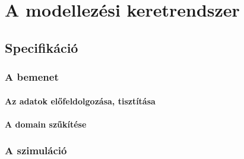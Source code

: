 \chapter{A modellezési keretrendszer}\label{sect:chapter_framework}
  \section{Specifikáció} %
    \subsection{A bemenet}
      \subsubsection{Az adatok előfeldolgozása, tisztítása}
      \subsubsection{A domain szűkítése}
    \subsection{A szimuláció}
